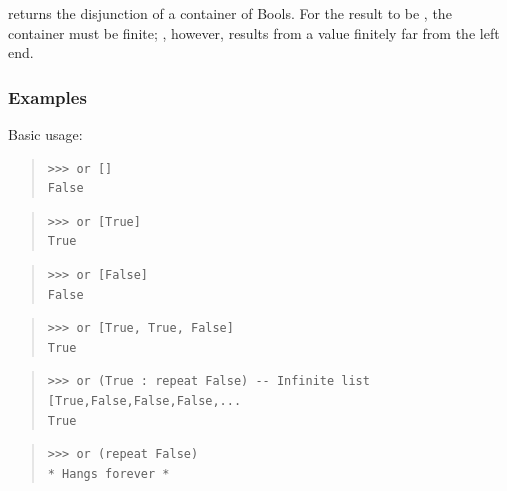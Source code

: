 \begin{haddockdesc}
\item[\begin{tabular}{@{}l}
or :: Foldable t => t Bool -> Bool
\end{tabular}]
{\haddockbegindoc
{} returns the disjunction of a container of Bools.  For the
 result to be , the container must be finite; , however,
 results from a  value finitely far from the left end.\par
\subsubsection*{\textbf{Examples}}
Basic usage:\par
\begin{quote}
{\haddockverb\begin{verbatim}
>>> or []
False

\end{verbatim}}
\end{quote}
\begin{quote}
{\haddockverb\begin{verbatim}
>>> or [True]
True

\end{verbatim}}
\end{quote}
\begin{quote}
{\haddockverb\begin{verbatim}
>>> or [False]
False

\end{verbatim}}
\end{quote}
\begin{quote}
{\haddockverb\begin{verbatim}
>>> or [True, True, False]
True

\end{verbatim}}
\end{quote}
\begin{quote}
{\haddockverb\begin{verbatim}
>>> or (True : repeat False) -- Infinite list [True,False,False,False,...
True

\end{verbatim}}
\end{quote}
\begin{quote}
{\haddockverb\begin{verbatim}
>>> or (repeat False)
* Hangs forever *

\end{verbatim}}
\end{quote}}
\end{haddockdesc}

